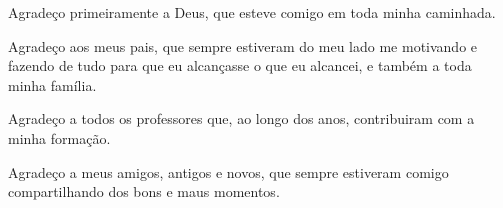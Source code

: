 Agradeço primeiramente a Deus, que esteve comigo em toda minha caminhada.

Agradeço aos meus pais, que sempre estiveram do meu lado me motivando e fazendo de tudo para que eu alcançasse o que eu alcancei, e também a toda minha família.

Agradeço a todos os professores que, ao longo dos anos, contribuiram com a minha formação.

Agradeço a meus amigos, antigos e novos, que sempre estiveram comigo compartilhando dos bons e maus momentos.

